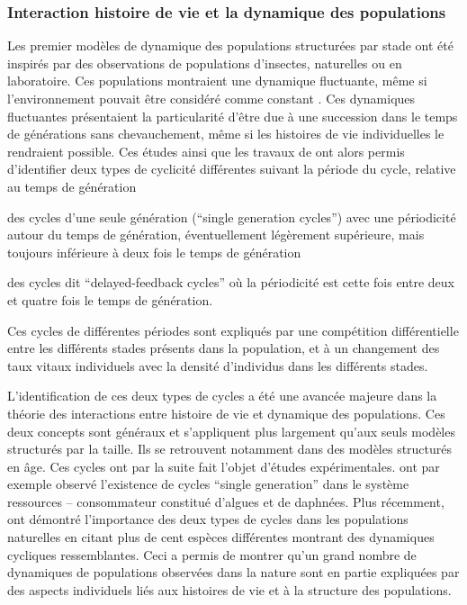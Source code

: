 \subsubsection{Interaction histoire de vie et la dynamique des populations}
\label{modelPopStru}
Les premier modèles de dynamique des populations structurées par stade
\autocites{gurney1980a,gurney1983a,nisbet1983a,lawton1981a} ont été inspirés par
des observations de populations d'insectes, naturelles ou en laboratoire. Ces
populations montraient une dynamique fluctuante, même si l'environnement pouvait
être considéré comme constant
\autocites{nicholson1954a,gurney1983a,ebenman1988a,godfray1989a}. Ces dynamiques
fluctuantes présentaient la particularité d'être due à une succession dans le
temps de générations sans chevauchement, même si les
histoires de vie individuelles le rendraient possible. Ces études ainsi que les
travaux de \textcite{gurney1985a} ont alors permis d'identifier deux types de
cyclicité différentes suivant la période du cycle, relative au temps de
génération
\begin{enumerate*}[label=(\roman*), before=\unskip{ : }, itemjoin={{ ; }},
itemjoin*={{ ; et }}]
  \item des cycles d'une seule génération (``single generation cycles'') avec une
  périodicité autour du temps de génération, éventuellement légèrement
  supérieure, mais toujours inférieure à deux fois le temps de génération
  \item des cycles dit ``delayed-feedback cycles'' où la périodicité est cette
  fois entre deux et quatre fois le temps de génération. 
\end{enumerate*} 
Ces cycles de différentes périodes sont expliqués par une compétition
différentielle entre les différents stades présents dans la population, et à un
changement des taux vitaux individuels avec la densité d'individus dans les
différents stades.

L'identification de ces deux types de cycles a été une avancée majeure dans la
théorie des interactions entre histoire de vie et dynamique des populations. Ces
deux concepts sont généraux et s'appliquent plus largement qu'aux seuls modèles
structurés par la taille. Ils se retrouvent notamment dans des modèles
structurés en âge. Ces cycles ont par la suite fait l'objet d'études expérimentales.
\textcite{mccauley1987a} ont par exemple observé l'existence de cycles ``single
generation'' dans le système ressources -- consommateur constitué d'algues et de
daphnées. Plus récemment, \textcite{murdoch2002a} ont démontré l'importance des
deux types de cycles dans les populations naturelles en citant plus de cent
espèces différentes montrant des dynamiques cycliques ressemblantes. Ceci a
permis de montrer qu'un grand nombre de dynamiques de populations observées dans
la nature sont en partie expliquées par des aspects individuels liés aux
histoires de vie et à la structure des populations.

